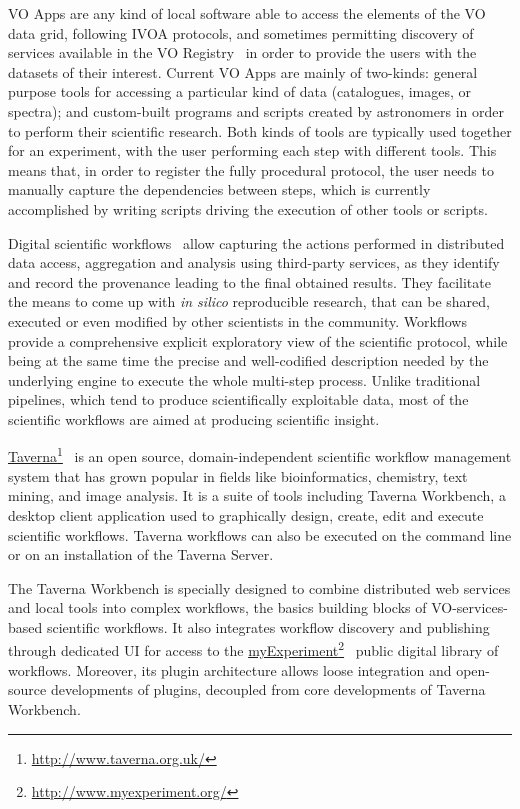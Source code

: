 \documentclass{aa}
\newcommand{\urlsamefont}[1]{\urlstyle{same}\url{#1}}
\newcommand{\hrefnote}[2]{\href{#1}{#2}\footnote{\urlsamefont{#1}}}
\begin{document}
VO Apps are any kind of local software able to access the elements of the VO data grid, following IVOA protocols, and sometimes permitting discovery of services available in the VO Registry~\citep{Benson2009} in order to provide the users with the datasets of their interest. Current VO Apps are mainly of two-kinds: general purpose tools for accessing a particular kind of data (catalogues, images, or spectra); and custom-built programs and scripts created by astronomers in order to perform their scientific research. Both kinds of tools are typically used together for an experiment, with the user performing each step with different tools. This means that, in order to register the fully procedural protocol, the user needs to manually capture the dependencies between steps, which is currently accomplished by writing scripts driving the execution of other tools or scripts.

Digital scientific workflows~\citep{Gil2007, Gil2008} allow capturing the actions performed in distributed data access, aggregation and analysis using third-party services, as they identify and record the provenance leading to the final obtained results. They facilitate the means to come up with \emph{in silico} reproducible research, that can be shared, executed or even modified by other scientists in the community. Workflows provide a comprehensive explicit exploratory view of the scientific protocol, while being at the same time the precise and well-codified description needed by the underlying engine to execute the whole multi-step process. Unlike traditional pipelines, which tend to produce scientifically exploitable data, most of the scientific workflows are aimed at producing scientific insight.

\hrefnote{http://www.taverna.org.uk/}{Taverna}~\citep{Wolstencroft01072013} is an open source, domain-independent scientific workflow management system that has grown popular in fields like bioinformatics, chemistry, text mining, and image analysis. It is a suite of tools including Taverna Workbench, a desktop client application used to graphically design, create, edit and execute scientific workflows. Taverna workflows can also be executed on the command line or on an installation of the Taverna Server.

The Taverna Workbench is specially designed to combine distributed web services and local tools into complex workflows, the basics building blocks of VO-services-based scientific workflows. It also integrates workflow discovery and publishing through dedicated UI for access to the \hrefnote{http://www.myexperiment.org/}{myExperiment}~\citep{Goble2010} public digital library of workflows. Moreover, its plugin architecture allows loose integration and open-source developments of plugins, decoupled from core developments of Taverna Workbench.
\end{document}
